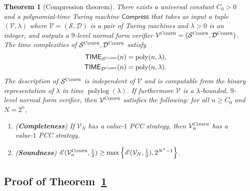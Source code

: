 \documentclass[11pt]{article}
\newtheorem{theorem}{Theorem}[section]
\theoremstyle{definition}
\DeclareMathOperator{\poly}{poly}
\DeclareMathOperator{\polylog}{polylog}
\newcommand{\sampler}{\mathcal{S}}
\newcommand{\decider}{\mathcal{D}}
\newcommand{\verifier}{\mathcal{V}}
\newcommand{\Ent}{\mathscr{E}}
\newcommand{\compr}{\textsc{Compr}}
\newcommand{\TIME}{\mathsf{TIME}}
\newcommand{\tmstyle}[1]{\ensuremath{\mathsf{#1}}}
\newcommand{\Compress}{\tmstyle{Compress}}
\begin{document}
\begin{theorem}[Compression theorem]
  \label{thm:compression}
  There exists a universal constant $C_0 > 0$ and a polynomial-time Turing machine $\Compress$ that takes as input a
  tuple $(\verifier, \lambda)$ where $\verifier = (\sampler,\decider)$ is a pair of Turing machines and $\lambda > 0$ is an integer, and outputs a $9$-level normal form verifier $\verifier^\compr = (\sampler^\compr,\decider^\compr)$.
  The time complexities of $\sampler^\compr,\decider^\compr$ satisfy
  \begin{equation*}
    \begin{split}
      \TIME_{\sampler^\compr}(n) & = \poly (n, \lambda),\\
      \TIME_{\decider^\compr}(n) & = \poly (n, \lambda).
    \end{split}
  \end{equation*}
  The description of $\sampler^\compr$ is independent of $\verifier$ and is
  computable from the binary representation of $\lambda$ in time $\polylog
  (\lambda)$.	
  If furthermore $\verifier$ is a $\lambda$-bounded, $9$-level normal form verifier, then 
  $\verifier^\compr$ satisfies the following: for all $n \geq C_0$ and $N = 2^n$,


\begin{enumerate}
  \item \label{enu:compr-completeness} (\textbf{Completeness}) If $\verifier_{N}$
    has a value-$1$ PCC strategy, then $\verifier^\compr_n$ has a value-$1$ PCC
    strategy.
\item \label{enu:compr-soundness} (\textbf{Soundness})
    $\Ent(\verifier_{n}^\compr,\frac{1}{2}) \geq \max \left \{
      \Ent(\verifier_{N}, \frac{1}{2}), 2^{N^{\lambda}-1}
    \right \}$.
  \end{enumerate}
\end{theorem}

\subsection{Proof of Theorem~\ref{thm:compression}}
\end{document}
